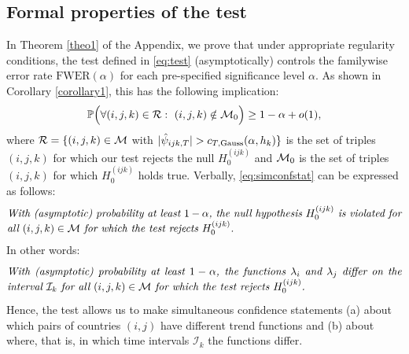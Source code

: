 \documentclass[a4paper,12pt]{article}
\numberwithin{equation}{section}
\begin{document}
\subsection{Formal properties of the test}\label{subsec:test:properties}


{\color{red}
In Theorem \ref{theo1} of the Appendix, we prove that under appropriate regularity conditions, the test defined in \eqref{eq:test} (asymptotically) controls the familywise error rate $\text{FWER}(\alpha)$ for each pre-specified significance level $\alpha$. As shown in Corollary \ref{corollary1}, this has the following implication:   
\begin{align}
\mathbb{P}\Big( \forall (i,j,k) \in \mathcal{R}: \ (i,j,k) \notin \mathcal{M}_0 \Big) \ge 1 - \alpha + o(1), \label{eq:simconfstat}
\end{align} 
where $\mathcal{R} = \{ (i,j,k) \in \mathcal{M}$ with $|\hat{\psi}_{ijk,T}| > c_{T,\textnormal{Gauss}}(\alpha,h_k) \}$ is the set of triples $(i,j,k)$ for which our test rejects the null $H_0^{(ijk)}$ and $\mathcal{M}_0$ is the set of triples $(i,j,k)$ for which $H_0^{(ijk)}$ holds true. Verbally, \eqref{eq:simconfstat} can be expressed as follows:  
\begin{equation}\label{eq:confidencestatement1}
\begin{minipage}[c][1cm][c]{13cm}
\textit{With (asymptotic) probability at least $1-\alpha$, the null hypothesis $H_0^{(ijk)}$ is violated for all $(i,j,k) \in \indexset$ for which the test rejects $H_0^{(ijk)}$.} 
\end{minipage}
\end{equation}
In other words: 
\begin{equation}\label{eq:confidencestatement2}
\begin{minipage}[c][1cm][c]{13cm}
\textit{With (asymptotic) probability at least $1-\alpha$, the functions $\lambda_i$ and $\lambda_j$ differ on the interval $\mathcal{I}_k$ for all $(i,j,k) \in \indexset$ for which the test rejects $H_0^{(ijk)}$.} 
\end{minipage}
\end{equation}
Hence, the test allows us to make simultaneous confidence statements (a) about which pairs of countries $(i,j)$ have different trend functions and (b) about where, that is, in which time intervals $\mathcal{I}_k$ the functions differ.


}
\end{document}
